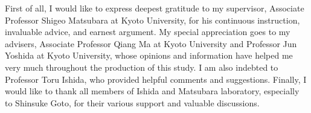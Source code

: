\documentclass[../main.tex]{subfiles}
\begin{document}
\acknowledgments{}

First of all, I would like to express deepest gratitude to my supervisor, Associate Professor Shigeo Matsubara at Kyoto University, for his continuous instruction, invaluable advice, and earnest argument.
My special appreciation goes to my advisers, Associate Professor Qiang Ma at Kyoto University and Professor Jun Yoshida at Kyoto University, whose opinions and information have helped me very much throughout the production of this study.
I am also indebted to Professor Toru Ishida, who provided helpful comments and suggestions.
Finally, I would like to thank all members of Ishida and Matsubara laboratory, especially to Shinsuke Goto, for their various support and valuable discussions.
\end{document}
